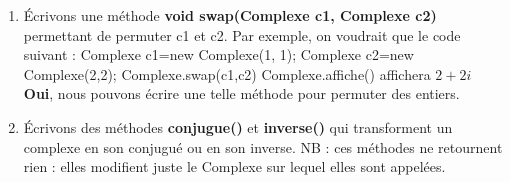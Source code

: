 \begin{enumerate}
      \item {Écrivons une méthode \textbf{void swap(Complexe c1, Complexe c2)} permettant de permuter c1 et c2. Par exemple, on voudrait que le code suivant : Complexe c1=new Complexe(1, 1); Complexe c2=new Complexe(2,2); Complexe.swap(c1,c2) Complexe.affiche()  affichera $2+2i$    \textbf{Oui}, nous pouvons écrire une telle méthode pour permuter des entiers.}
      \item {Écrivons des méthodes \textbf{conjugue()} et \textbf{inverse()} qui transforment un complexe en son conjugué ou en son inverse. NB : ces méthodes ne retournent rien : elles modifient juste le Complexe sur lequel elles sont appelées.  }
\end{enumerate}
% 
% 
% 